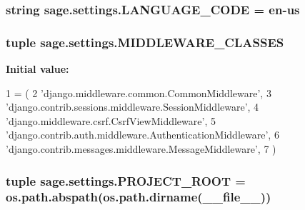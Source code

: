 \subsubsection[{L\+A\+N\+G\+U\+A\+G\+E\+\_\+\+C\+O\+D\+E}]{\setlength{\rightskip}{0pt plus 5cm}string sage.\+settings.\+L\+A\+N\+G\+U\+A\+G\+E\+\_\+\+C\+O\+D\+E = \textquotesingle{}en-\/us\textquotesingle{}}\label{namespacesage_1_1settings_ac5b7a49ef37a25508ecb84453063821a}
\hypertarget{namespacesage_1_1settings_a247a0ea3c79f999897dbfaed3bc99b1d}{}
\subsubsection[{M\+I\+D\+D\+L\+E\+W\+A\+R\+E\+\_\+\+C\+L\+A\+S\+S\+E\+S}]{\setlength{\rightskip}{0pt plus 5cm}tuple sage.\+settings.\+M\+I\+D\+D\+L\+E\+W\+A\+R\+E\+\_\+\+C\+L\+A\+S\+S\+E\+S}\label{namespacesage_1_1settings_a247a0ea3c79f999897dbfaed3bc99b1d}
{\bfseries Initial value\+:}
\begin{DoxyCode}
1 = (
2     \textcolor{stringliteral}{'django.middleware.common.CommonMiddleware'},
3     \textcolor{stringliteral}{'django.contrib.sessions.middleware.SessionMiddleware'},
4     \textcolor{stringliteral}{'django.middleware.csrf.CsrfViewMiddleware'},
5     \textcolor{stringliteral}{'django.contrib.auth.middleware.AuthenticationMiddleware'},
6     \textcolor{stringliteral}{'django.contrib.messages.middleware.MessageMiddleware'},
7 )
\end{DoxyCode}
\hypertarget{namespacesage_1_1settings_ae2e71004e0684c0243b4e9792726cd0f}{}
\subsubsection[{P\+R\+O\+J\+E\+C\+T\+\_\+\+R\+O\+O\+T}]{\setlength{\rightskip}{0pt plus 5cm}tuple sage.\+settings.\+P\+R\+O\+J\+E\+C\+T\+\_\+\+R\+O\+O\+T = os.\+path.\+abspath(os.\+path.\+dirname(\+\_\+\+\_\+file\+\_\+\+\_\+))}\label{namespacesage_1_1settings_ae2e71004e0684c0243b4e9792726cd0f}
\hypertarget{namespacesage_1_1settings_a92b3d804acae3871a9877ad143df4201}{}
